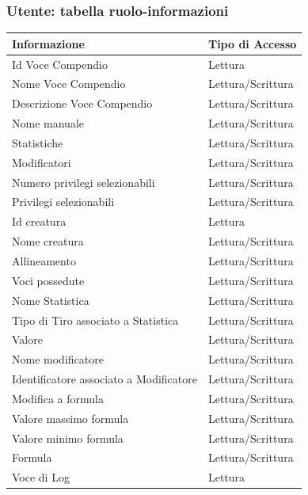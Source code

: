 \documentclass[a4paper, 11pt]{article}
\begin{document}
\subsubsection*{Utente: tabella ruolo-informazioni}
\begin{adjustwidth}{-0.5cm}{-0.5cm}
    \begin{tabular}{|l|l|}
        \hline
        \textbf{Informazione} & \textbf{Tipo di Accesso} \\
        \hline
        Id Voce Compendio& Lettura \\
        \hline
        Nome Voce Compendio& Lettura/Scrittura \\
        \hline
        Descrizione Voce Compendio& Lettura/Scrittura \\
        \hline
        Nome manuale & Lettura/Scrittura \\
        \hline
        Statistiche & Lettura/Scrittura \\
        \hline
        Modificatori & Lettura/Scrittura \\\hline
        Numero privilegi selezionabili & Lettura/Scrittura \\
        \hline
        Privilegi selezionabili & Lettura/Scrittura \\
        \hline
        Id creatura & Lettura \\
        \hline
        Nome creatura & Lettura/Scrittura \\
        \hline
        Allineamento & Lettura/Scrittura \\
        \hline
        Voci possedute & Lettura/Scrittura \\
        \hline
        Nome Statistica & Lettura/Scrittura \\\hline
        Tipo di Tiro associato a Statistica & Lettura/Scrittura \\\hline
        Valore & Lettura/Scrittura \\\hline
        Nome modificatore & Lettura/Scrittura \\\hline
        Identificatore associato a Modificatore & Lettura/Scrittura \\\hline
        Modifica a formula & Lettura/Scrittura \\\hline
        Valore massimo formula & Lettura/Scrittura \\
        \hline
        Valore minimo formula & Lettura/Scrittura \\
        \hline
        Formula & Lettura/Scrittura \\
        \hline
        Voce di Log & Lettura \\
        \hline
    \end{tabular}
\end{adjustwidth}
\end{document}

